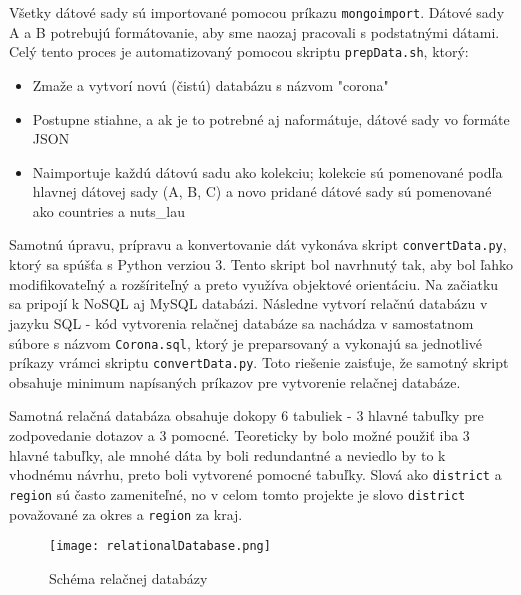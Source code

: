 \documentclass [11pt, a4paper]{article}
\begin{document}
Všetky dátové sady sú importované pomocou príkazu \texttt{mongoimport}. Dátové sady A a B potrebujú formátovanie, aby sme naozaj pracovali s podstatnými dátami. Celý tento proces je automatizovaný pomocou skriptu \texttt{prepData.sh}, ktorý:
\begin{itemize}
\item Zmaže a vytvorí novú (čistú) databázu s názvom "corona"
\item Postupne stiahne, a ak je to potrebné aj naformátuje, dátové sady vo formáte JSON
\item Naimportuje každú dátovú sadu ako kolekciu; kolekcie sú pomenované podľa hlavnej dátovej sady (A, B, C) a novo pridané dátové sady sú pomenované ako countries a nuts\_lau
\end{itemize}

Samotnú úpravu, prípravu a  konvertovanie dát vykonáva skript \texttt{convertData.py}, ktorý sa spúšťa s Python verziou 3. Tento skript bol navrhnutý tak, aby bol ľahko modifikovateľný a rozšíriteľný a preto využíva objektové orientáciu. Na začiatku sa pripojí k NoSQL aj MySQL databázi. Následne vytvorí relačnú databázu v jazyku SQL - kód vytvorenia relačnej databáze sa nachádza v samostatnom súbore s názvom \texttt{Corona.sql}, ktorý je preparsovaný a vykonajú sa jednotlivé príkazy vrámci skriptu \texttt{convertData.py}. Toto riešenie zaisťuje, že samotný skript obsahuje minimum  napísaných príkazov pre vytvorenie relačnej databáze.

Samotná relačná databáza obsahuje dokopy 6 tabuliek - 3 hlavné tabuľky pre zodpovedanie dotazov a 3 pomocné. Teoreticky by bolo možné použiť iba 3 hlavné tabuľky, ale mnohé dáta by boli redundantné a neviedlo by to k vhodnému návrhu, preto boli vytvorené pomocné tabuľky. Slová ako \texttt{district} a \texttt{region} sú často zameniteľné, no v celom tomto projekte je slovo \texttt{district} považované za okres a \texttt{region} za kraj.

\begin{figure}[H]
\begin{center}
\texttt{[image: relationalDatabase.png]}
\caption{Schéma relačnej databázy}
\end{center}
\end{figure}
\end{document}
